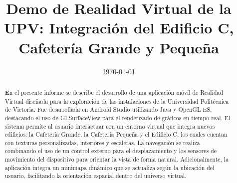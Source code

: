 \documentclass[conference]{IEEEtran}
\date{\specialdate\today}
\begin{document}
%
%
%

\newcommand{\breite}{1.0} %
\newcommand{\RelacionFiguradoscolumnas}{0.9}
\newcommand{\RelacionFiguradoscolumnasPuntoCinco}{0.45}




\title{Demo de Realidad Virtual de la UPV: Integración del Edificio C, Cafetería Grande y Pequeña}


\author{
		
}


\maketitle

\begin{abstract} 
\textbf En el presente informe se describe el desarrollo de una aplicación móvil de Realidad Virtual diseñada para la exploración de las instalaciones de la Universidad Politécnica de Victoria. Fue desarrollada en Android Studio utilizando Java y OpenGL ES, destacando el uso de GLSurfaceView para el renderizado de gráficos en tiempo real. El sistema permite al usuario interactuar con un entorno virtual que integra nuevos edificios: la Cafetería Grande, la Cafetería Pequeña y el Edificio C, los cuales cuentan con texturas personalizadas, interiores y escaleras. La navegación se realiza combinando el uso de un control externo para el desplazamiento y los sensores de movimiento del dispositivo para orientar la vista de forma natural. Adicionalmente, la aplicación integra un minimapa dinámico que se actualiza según la ubicación del usuario, facilitando la orientación espacial dentro del universo virtual.
\end{abstract}
\end{document}
